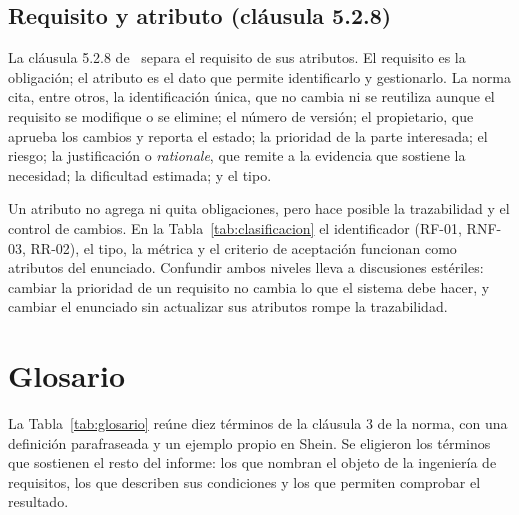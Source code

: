 \documentclass[11pt,a4paper]{article}
\begin{document}
\subsection{Requisito y atributo (cláusula 5.2.8)}
\label{sec:resumen-528}

La cláusula 5.2.8 de~\cite{iso29148} separa el requisito de sus atributos.
El requisito es la obligación; el atributo es el dato que permite
identificarlo y gestionarlo. La norma cita, entre otros, la identificación
única, que no cambia ni se reutiliza aunque el requisito se modifique o se
elimine; el número de versión; el propietario, que aprueba los cambios y
reporta el estado; la prioridad de la parte interesada; el riesgo; la
justificación o \emph{rationale}, que remite a la evidencia que sostiene la
necesidad; la dificultad estimada; y el tipo.

Un atributo no agrega ni quita obligaciones, pero hace posible la
trazabilidad y el control de cambios. En la Tabla~\ref{tab:clasificacion}
el identificador (RF-01, RNF-03, RR-02), el tipo, la métrica y el criterio
de aceptación funcionan como atributos del enunciado. Confundir ambos
niveles lleva a discusiones estériles: cambiar la prioridad de un requisito
no cambia lo que el sistema debe hacer, y cambiar el enunciado sin
actualizar sus atributos rompe la trazabilidad.

\section{Glosario}
\label{sec:glosario}

La Tabla~\ref{tab:glosario} reúne diez términos de la cláusula 3 de la
norma, con una definición parafraseada y un ejemplo propio en Shein. Se
eligieron los términos que sostienen el resto del informe: los que nombran
el objeto de la ingeniería de requisitos, los que describen sus condiciones
y los que permiten comprobar el resultado.
\end{document}
